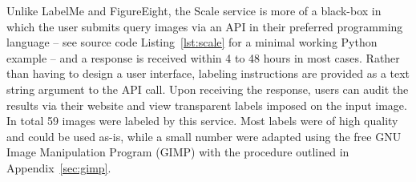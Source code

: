 \documentclass[11pt]{article} %
\begin{document}
\begin{enumerate}
Unlike LabelMe and FigureEight, the Scale service is more of a black-box in 
which the user submits query images via an API in their preferred programming
language -- see source code Listing~\ref{lst:scale} for a minimal working 
Python example -- and a response is received within 4 to 48 hours in most 
cases. Rather than having to design a user interface, labeling instructions are 
provided as a text string argument to the API call. Upon receiving the 
response, users can audit the results via their website and view transparent 
labels imposed on the input image. In total 59 images were labeled by this 
service. Most labels were of high quality and could be used as-is, while a 
small number were adapted using the free GNU Image Manipulation Program (GIMP) 
with the procedure outlined in Appendix~\ref{sec:gimp}.

\end{enumerate}
\end{document}
